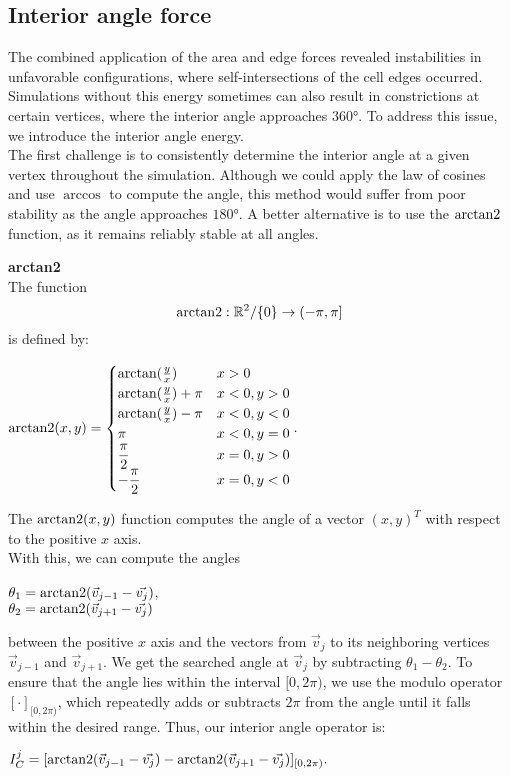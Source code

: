 \subsection{Interior angle force}
The combined application of the area and edge forces revealed instabilities in unfavorable configurations, where self-intersections of the cell edges occurred. 
Simulations without this energy sometimes can also result in constrictions at certain vertices, where the interior angle approaches $360$°. 
To address this issue, we introduce the interior angle energy. \\
The first challenge is to consistently determine the interior angle at a given vertex throughout the simulation.
Although we could apply the law of cosines and use $\arccos$ to compute the angle, this method would suffer from poor stability as the angle approaches $180$°.
A better alternative is to use the $\operatorname{arctan2}$ function, as it remains reliably stable at all angles. \\

\begin{definition} \textbf{arctan2} \\
	The function $$\operatorname{arctan2}:\mathbb{R}^2/\{0\} \rightarrow (-\pi, \pi]$$ is defined by:
	\begin{center}
		$ \operatorname{arctan2}(x,y) = 
		\begin{cases}
			\arctan(\frac{y}{x}) & x > 0 \\
			\arctan(\frac{y}{x}) + \pi & x < 0, y > 0 \\
			\arctan(\frac{y}{x}) - \pi & x < 0, y < 0 \\
			\pi & x < 0, y = 0 \\
			\dfrac{\pi}{2} & x = 0, y > 0 \\ 		
			- \dfrac{\pi}{2} & x = 0, y < 0 \\ 
		\end{cases}. $
	\end{center}
\end{definition}

The $\operatorname{arctan2}(x,y)$ function computes the angle of a vector $(x,y)^T$ with respect to the positive $x$ axis. \\
With this, we can compute the angles 
\begin{center}
	
	$\theta_1 = \operatorname{arctan2}( \vec{v}_{j-1} - \vec{v_j} )$, \\
	$\theta_2 = \operatorname{arctan2}( \vec{v}_{j+1} - \vec{v_j} )$
	
\end{center}
between the positive $x$ axis and the vectors from $\vec{v}_j$ to its neighboring vertices $\vec{v}_{j-1}$ and $\vec{v}_{j+1}$. 
We get the searched angle at $\vec{v}_j$ by subtracting $\theta_1 - \theta_2$.
To ensure that the angle lies within the interval $[0, 2\pi)$, we use the modulo operator $[ \cdot ]_{[0,2\pi)}$, which repeatedly adds or subtracts $2\pi$ from the angle until it falls within the desired range.
Thus, our interior angle operator is: 
\begin{center}
	$
	I^j_C = [\operatorname{arctan2}(\vec{v}_{j-1} - \vec{v_j}) - \operatorname{arctan2}(\vec{v}_{j+1} - \vec{v_j})]_{[0,2\pi)}.
	$
\end{center}

